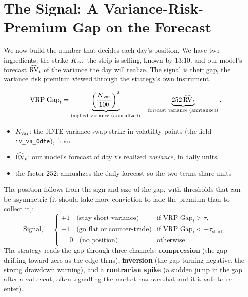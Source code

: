 \section{The Signal: A Variance-Risk-Premium Gap on the Forecast}
\label{sec:gsvivs:signal}

We now build the number that decides each day's position. We have two ingredients: the strike $K_{\mathrm{var}}$ the strip is selling, known by 13:10, and our model's forecast $\widehat{\operatorname{RV}}_t$ of the variance the day will realize. The signal is their gap, the variance risk premium viewed through the strategy's own instrument.

\begin{equation}
\label{eq:gsvivs:vrpgap}
\text{VRP Gap}_t = \underbrace{\left(\frac{K_{\mathrm{var}}}{100}\right)^2}_{\text{implied variance (annualized)}} - \underbrace{252\,\widehat{\operatorname{RV}}_t}_{\text{forecast variance (annualized)}}.
\end{equation}
\begin{itemize}
  \item $K_{\mathrm{var}}$: the 0DTE variance-swap strike in volatility points (the field \texttt{iv\_vs\_0dte}), from .
  \item $\widehat{\operatorname{RV}}_t$: our model's forecast of day $t$'s realized \emph{variance}, in daily units.
  \item the factor $252$: annualizes the daily forecast so the two terms share units.
\end{itemize}

The position follows from the sign and size of the gap, with thresholds that can be asymmetric (it should take more conviction to fade the premium than to collect it):
\begin{equation}
\label{eq:gsvivs:signalrule}
\text{Signal}_t =
\begin{cases}
+1 \quad \text{(stay short variance)} & \text{if VRP Gap}_t > \tau, \\
-1 \quad \text{(go flat or counter-trade)} & \text{if VRP Gap}_t < -\tau_{\text{short}}, \\
\phantom{+}0 \quad \text{(no position)} & \text{otherwise.}
\end{cases}
\end{equation}
The strategy reads the gap through three channels: \textbf{compression} (the gap drifting toward zero as the edge thins), \textbf{inversion} (the gap turning negative, the strong drawdown warning), and a \textbf{contrarian spike} (a sudden jump in the gap after a vol event, often signalling the market has overshot and it is safe to re-enter).

